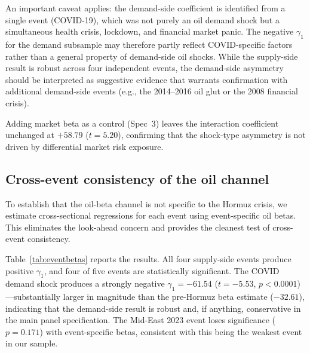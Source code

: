 \documentclass[12pt,preprint,authoryear]{elsarticle}
\begin{document}
An important caveat applies: the demand-side coefficient is identified from a single event (COVID-19), which was not purely an oil demand shock but a simultaneous health crisis, lockdown, and financial market panic. The negative $\gamma_1$ for the demand subsample may therefore partly reflect COVID-specific factors rather than a general property of demand-side oil shocks. While the supply-side result is robust across four independent events, the demand-side asymmetry should be interpreted as suggestive evidence that warrants confirmation with additional demand-side events (e.g., the 2014--2016 oil glut or the 2008 financial crisis).

Adding market beta as a control (Spec~3) leaves the interaction coefficient unchanged at $+58.79$ ($t = 5.20$), confirming that the shock-type asymmetry is not driven by differential market risk exposure.

\subsection{Cross-event consistency of the oil channel}
To establish that the oil-beta channel is not specific to the Hormuz crisis, we estimate cross-sectional regressions for each event using event-specific oil betas. This eliminates the look-ahead concern and provides the cleanest test of cross-event consistency.

Table~\ref{tab:eventbetas} reports the results. All four supply-side events produce positive $\gamma_1$, and four of five events are statistically significant. The COVID demand shock produces a strongly negative $\gamma_1 = -61.54$ ($t = -5.53$, $p < 0.0001$)---substantially larger in magnitude than the pre-Hormuz beta estimate ($-32.61$), indicating that the demand-side result is robust and, if anything, conservative in the main panel specification. The Mid-East 2023 event loses significance ($p = 0.171$) with event-specific betas, consistent with this being the weakest event in our sample.
\end{document}
